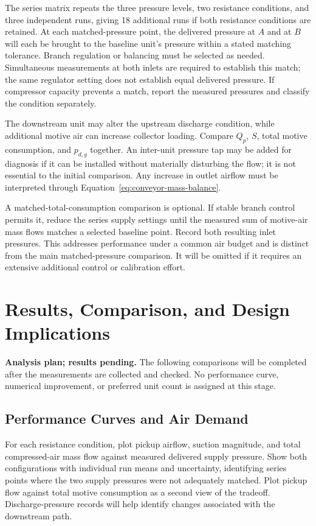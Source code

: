 The series matrix repeats the three pressure levels, two resistance conditions, and three independent runs, giving 18 additional runs if both resistance conditions are retained. At each matched-pressure point, the delivered pressure at $A$ and at $B$ will each be brought to the baseline unit's pressure within a stated matching tolerance. Branch regulation or balancing must be selected as needed. Simultaneous measurements at both inlets are required to establish this match; the same regulator setting does not establish equal delivered pressure. If compressor capacity prevents a match, report the measured pressures and classify the condition separately.

The downstream unit may alter the upstream discharge condition, while additional motive air can increase collector loading. Compare $Q_p$, $S$, total motive consumption, and $p_{d,g}$ together. An inter-unit pressure tap may be added for diagnosis if it can be installed without materially disturbing the flow; it is not essential to the initial comparison. Any increase in outlet airflow must be interpreted through Equation~\ref{eq:conveyor-mass-balance}.

A matched-total-consumption comparison is optional. If stable branch control permits it, reduce the series supply settings until the measured sum of motive-air mass flows matches a selected baseline point. Record both resulting inlet pressures. This addresses performance under a common air budget and is distinct from the main matched-pressure comparison. It will be omitted if it requires an extensive additional control or calibration effort.


\section{Results, Comparison, and Design Implications}
\label{sec:vacuum-results}
\textbf{Analysis plan; results pending.} The following comparisons will be completed after the measurements are collected and checked. No performance curve, numerical improvement, or preferred unit count is assigned at this stage.

\subsection{Performance Curves and Air Demand}
For each resistance condition, plot pickup airflow, suction magnitude, and total compressed-air mass flow against measured delivered supply pressure. Show both configurations with individual run means and uncertainty, identifying series points where the two supply pressures were not adequately matched. Plot pickup flow against total motive consumption as a second view of the tradeoff. Discharge-pressure records will help identify changes associated with the downstream path.

